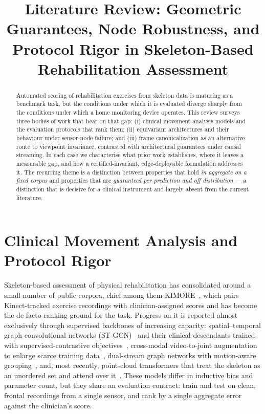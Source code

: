 \documentclass[11pt]{article}
\title{\vspace{-2em}Literature Review: Geometric Guarantees, Node Robustness, and\\
Protocol Rigor in Skeleton-Based Rehabilitation Assessment}
\author{}
\date{}
\begin{document}
\maketitle
\vspace{-3em}

\begin{abstract}
\noindent Automated scoring of rehabilitation exercises from skeleton data is maturing as a
benchmark task, but the conditions under which it is evaluated diverge sharply from the conditions
under which a home monitoring device operates. This review surveys three bodies of work that bear on
that gap: (i) clinical movement-analysis models and the evaluation protocols that rank them; (ii)
equivariant architectures and their behaviour under sensor-node failure; and (iii) frame
canonicalization as an alternative route to viewpoint invariance, contrasted with architectural
guarantees under causal streaming. In each case we characterise what prior work establishes, where it
leaves a measurable gap, and how a certified-invariant, edge-deployable formulation addresses it. The
recurring theme is a distinction between properties that hold \emph{in aggregate on a fixed corpus} and
properties that are \emph{guaranteed per prediction and off distribution} --- a distinction that is
decisive for a clinical instrument and largely absent from the current literature.
\end{abstract}

\section{Clinical Movement Analysis and Protocol Rigor}
Skeleton-based assessment of physical rehabilitation has consolidated around a small number of public
corpora, chief among them KIMORE~\cite{capecci2019kimore}, which pairs Kinect-tracked exercise
recordings with clinician-assigned scores and has become the de facto ranking ground for the task.
Progress on it is reported almost exclusively through supervised backbones of increasing capacity:
spatial--temporal graph convolutional networks (ST-GCN)~\cite{yan2018stgcn} and their clinical
descendants trained with supervised-contrastive objectives~\cite{karlov2024}, cross-modal video-to-joint
augmentation to enlarge scarce training data~\cite{abedi2023}, dual-stream graph networks with
motion-aware grouping~\cite{kuang2026}, and, most recently, point-cloud transformers that treat the
skeleton as an unordered set and attend over it~\cite{pct2026}. These models differ in inductive bias
and parameter count, but they share an evaluation contract: train and test on clean, frontal recordings
from a single sensor, and rank by a single aggregate error against the clinician's score.
\end{document}
